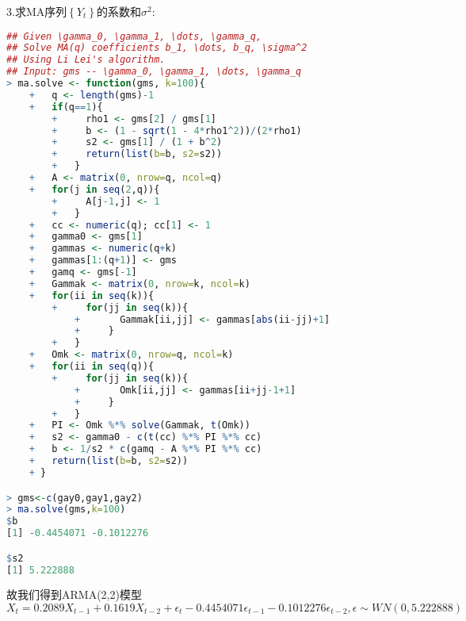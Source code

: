 \documentclass[11pt,a4paper]{ctexart}
\begin{document}
\begin{enumerate}
3.求MA序列$ \left\lbrace Y_t \right\rbrace  $的系数和$ \sigma^2 $:
\begin{lstlisting}[language=r]
## Given \gamma_0, \gamma_1, \dots, \gamma_q,
## Solve MA(q) coefficients b_1, \dots, b_q, \sigma^2
## Using Li Lei's algorithm.
## Input: gms -- \gamma_0, \gamma_1, \dots, \gamma_q
> ma.solve <- function(gms, k=100){
	+   q <- length(gms)-1
	+   if(q==1){
		+     rho1 <- gms[2] / gms[1]
		+     b <- (1 - sqrt(1 - 4*rho1^2))/(2*rho1)
		+     s2 <- gms[1] / (1 + b^2)
		+     return(list(b=b, s2=s2))
		+   }
	+   A <- matrix(0, nrow=q, ncol=q)
	+   for(j in seq(2,q)){
		+     A[j-1,j] <- 1
		+   }
	+   cc <- numeric(q); cc[1] <- 1
	+   gamma0 <- gms[1]
	+   gammas <- numeric(q+k)
	+   gammas[1:(q+1)] <- gms
	+   gamq <- gms[-1]
	+   Gammak <- matrix(0, nrow=k, ncol=k)
	+   for(ii in seq(k)){
		+     for(jj in seq(k)){
			+       Gammak[ii,jj] <- gammas[abs(ii-jj)+1]
			+     }
		+   }
	+   Omk <- matrix(0, nrow=q, ncol=k)
	+   for(ii in seq(q)){
		+     for(jj in seq(k)){
			+       Omk[ii,jj] <- gammas[ii+jj-1+1]
			+     }
		+   }
	+   PI <- Omk %*% solve(Gammak, t(Omk))
	+   s2 <- gamma0 - c(t(cc) %*% PI %*% cc)
	+   b <- 1/s2 * c(gamq - A %*% PI %*% cc)
	+   return(list(b=b, s2=s2))
	+ }

> gms<-c(gay0,gay1,gay2)
> ma.solve(gms,k=100)
$b
[1] -0.4454071 -0.1012276

$s2
[1] 5.222888
\end{lstlisting}

故我们得到ARMA(2,2)模型
$$ X_t=0.2089X_{t-1}+0.1619X_{t-2}+\epsilon_t-0.4454071\epsilon_{t-1}-0.1012276\epsilon_{t-2} ,\epsilon\sim WN(0,5.222888)$$

\end{enumerate}
\end{document}
